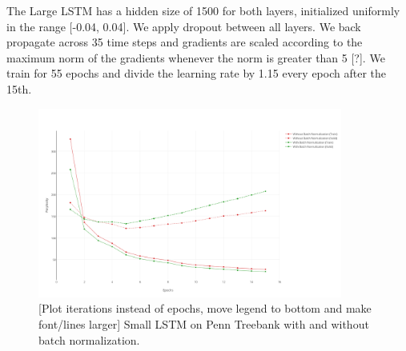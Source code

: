 \documentclass{article}
\begin{document}
The Large LSTM has a hidden size of 1500 for both layers, initialized uniformly in the range [-0.04, 0.04]. We apply dropout between all layers. We back propagate across 35 time steps and gradients are scaled according to the maximum norm of the gradients whenever the norm is greater than 5 [?]. We train for 55 epochs and divide the learning rate by 1.15 every epoch after the 15th.

\begin{figure}[t]
  \centering
  \includegraphics[width=100mm]{ptb_small_norm_plot.png}
  \caption{[Plot iterations instead of epochs, move legend to bottom and make font/lines larger] Small LSTM on Penn Treebank with and without batch normalization.}
  \label{overflow}
\end{figure}
\end{document}
